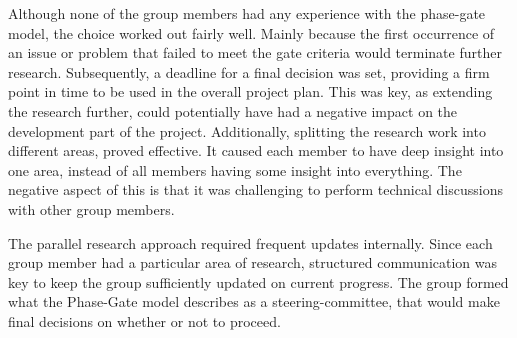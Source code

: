 Although none of the group members had any experience with the phase-gate model, the choice worked out fairly well. Mainly because the first occurrence of an issue or problem that failed to meet the gate criteria would terminate further research. Subsequently, a deadline for a final decision was set, providing a firm point in time to be used in the overall project plan. This was key, as extending the research further, could potentially have had a negative impact on the development part of the project. Additionally, splitting the research work into different areas, proved effective. It caused each member to have deep insight into one area, instead of all members having some insight into everything. The negative aspect of this is that it was challenging to perform technical discussions with other group members.

The parallel research approach required frequent updates internally. Since each group member had a particular area of research, structured communication was key to keep the group sufficiently updated on current progress. The group formed what the Phase-Gate model describes as a steering-committee, that would make final decisions on whether or not to proceed.



